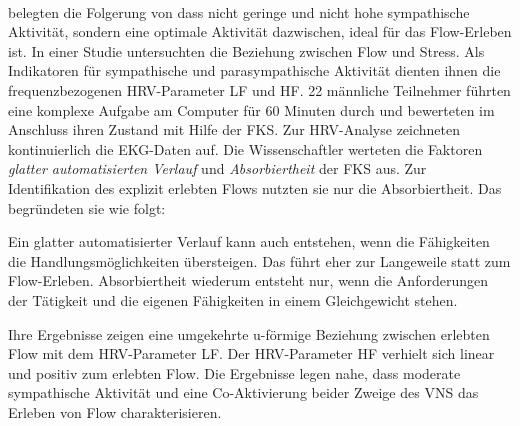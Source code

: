 \paragraph{\citet{Peifer2014}} 

\label{par:peifer2014}

belegten die Folgerung von \citet{deManzano2010, Peifer2012} dass nicht geringe und nicht hohe sympathische Aktivität, sondern eine optimale Aktivität dazwischen, ideal für das Flow-Erleben ist. In einer Studie untersuchten \citet{Peifer2014} die Beziehung zwischen Flow und Stress. Als Indikatoren für sympathische und parasympathische Aktivität dienten ihnen die frequenzbezogenen \ac{HRV}-Parameter \ac{LF} und \ac{HF}. 22 männliche Teilnehmer führten eine komplexe Aufgabe am Computer für 60 Minuten durch und bewerteten im Anschluss ihren Zustand mit Hilfe der \ac{FKS}. Zur \ac{HRV}-Analyse zeichneten \citet{Peifer2014} kontinuierlich die \ac{EKG}-Daten auf. Die Wissenschaftler werteten die Faktoren \emph{glatter automatisierten Verlauf} und \emph{Absorbiertheit} der \ac{FKS} aus. Zur Identifikation des explizit erlebten Flows nutzten sie nur die Absorbiertheit. Das begründeten sie wie folgt:

Ein glatter automatisierter Verlauf kann auch entstehen, wenn die Fähigkeiten die Handlungsmöglichkeiten übersteigen. Das führt eher zur Langeweile statt zum Flow-Erleben. Absorbiertheit wiederum entsteht nur, wenn die Anforderungen der Tätigkeit und die eigenen Fähigkeiten in einem Gleichgewicht stehen.

Ihre Ergebnisse zeigen eine umgekehrte u-förmige Beziehung zwischen erlebten Flow mit dem \ac{HRV}-Parameter \ac{LF}. Der \ac{HRV}-Parameter \ac{HF} verhielt sich linear und positiv zum erlebten Flow. Die Ergebnisse legen nahe, dass moderate sympathische Aktivität und eine Co-Aktivierung beider Zweige des \ac{VNS} das Erleben von Flow charakterisieren.

\paragraph{\citet{Tozman2015}} 

\label{par:tozman2015}

